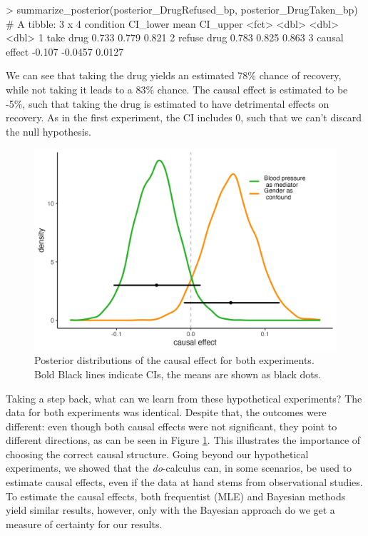 \documentclass[nobib]{tufte-handout}
\newcommand{\docalc}{\emph{do}-calculus\xspace}
\begin{document}
\begin{minipage}[]{\textwidth}
\begin{rc}
> summarize_posterior(posterior_DrugRefused_bp, posterior_DrugTaken_bp)
# A tibble: 3 x 4
  condition     CI_lower    mean CI_upper
  <fct>            <dbl>   <dbl>    <dbl>
1 take drug        0.733  0.779    0.821 
2 refuse drug      0.783  0.825    0.863 
3 causal effect   -0.107 -0.0457   0.0127
\end{rc}
\end{minipage}

\vspace{-0.5cm}
We can see that taking the drug yields an estimated 78\% chance of recovery, while not taking it leads to a 83\% chance.
The causal effect is estimated to be -5\%, such that taking the drug is estimated to have detrimental effects on recovery.
As in the first experiment, the CI includes 0, such that we can't discard the null hypothesis.

\begin{figure}
    \centering
    \includegraphics[width=0.8\linewidth]{img/posterior_causal_effect_smooth.png}
    \caption{Posterior distributions of the causal effect for both experiments. Bold Black lines indicate CIs, the means are shown as black dots.}
    \label{fig:posteriors}
\end{figure}

Taking a step back, what can we learn from these hypothetical experiments?
The data for both experiments was identical.
Despite that, the outcomes were different: even though both causal effects were not significant, they point to different directions, as can be seen in Figure \ref{fig:posteriors}.
This illustrates the importance of choosing the correct causal structure. 
Going beyond our hypothetical experiments, we showed that the \docalc can, in some scenarios, be used to estimate causal effects, even if the data at hand stems from observational studies.
To estimate the causal effects, both frequentist (MLE) and Bayesian methods yield similar results, however, only with the Bayesian approach do we get a measure of certainty for our results.

\printbibliography[heading=bibintoc]
\end{document}
